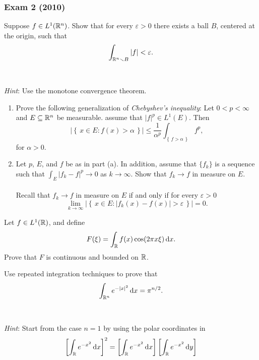 \subsubsection{Exam 2 (2010)}
\setcounter{exercise}{0}
\setcounter{equation}{0}

\begin{problem}
Suppose $f\in L^1(\mathbb{R}^n)$. Show that for every $\varepsilon>0$ there
exists a ball $B$, centered at the origin, such that
\[
\int_{\mathbb{R}^n\smallsetminus B}|f|<\varepsilon.
\]
\\\\
\emph{Hint}: Use the monotone convergence theorem.
\end{problem}
\begin{solution}
\end{solution}
\begin{problem}
\begin{enumerate}[label=(\alph*),noitemsep]
\item Prove the following generalization of \emph{Chebyshev's inequality}:
  Let $0<p<\infty$ and $E\subseteq\mathbb{R}^n$ be measurable. assume that
  $|f|^p\in L^1(E)$. Then
\[
\left|\left\{\,x\in E:f( x )>\alpha\,\right\}\right|
\leq\frac{1}{\alpha^p}\int_{\left\{\,f>\alpha\,\right\}}f^p,
\]
for $\alpha>0$.
\item Let $p$, $E$, and $f$ be as in part (a). In addition, assume that
  $\{f_k\}$ is a sequence such that $\int_E|f_k-f|^p\to 0$ as
  $k\to\infty$. Show that $f_k\to f$ in measure on $E$.
\\\\
Recall that $f_k\to f$ in measure on $E$ if and only if for every
$\varepsilon>0$
\[
\lim_{k\to\infty}\left|\left\{\, x \in
    E:|f_k( x )-f( x )|>\varepsilon\,\right\}\right|=0.
\]
\end{enumerate}
\end{problem}
\begin{solution}
\end{solution}

\begin{problem}
Let $f\in L^1(\mathbb{R})$, and define
\[
F(\xi)=\int_{\mathbb{R}} f(x)\cos(2\pi x\xi)\mathop{}\!\mathrm{d} x.
\]
Prove that $F$ is continuous and bounded on $\mathbb{R}$.
\end{problem}
\begin{solution}
\end{solution}

\begin{problem}
Use repeated integration techniques to prove that
\[
\int_{\mathbb{R}^n} e^{-| x |^2}\mathop{}\!\mathrm{d} x=\pi^{n/2}.
\]
\\\\
\emph{Hint}: Start from the case $n=1$ by using the polar coordinates in
\[
  \left[\int_{\bbR} e^{-x^2}\diff x\right]^2=%
  \left[\int_{\bbR} e^{-x^2}\diff x\right]%
  \left[\int_{\bbR} e^{-x^2}\diff y\right]%
\]
\end{problem}
\begin{solution}
\end{solution}

\begin{problem}
\end{problem}
\begin{solution}
\end{solution}

